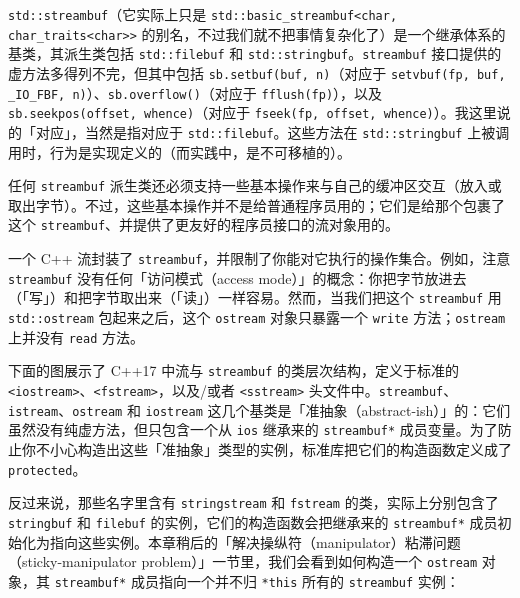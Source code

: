 \texttt{std::\allowbreak{}streambuf}（它实际上只是 \texttt{std::\allowbreak{}basic\_\allowbreak{}streambuf<\allowbreak{}char,\allowbreak{}} \texttt{char\_\allowbreak{}traits<char>{}>} 的别名，不过我们就不把事情复杂化了）是一个继承体系的基类，其派生类包括 \texttt{std::\allowbreak{}filebuf} 和 \texttt{std::\allowbreak{}stringbuf}。\texttt{streambuf} 接口提供的虚方法多得列不完，但其中包括 \texttt{sb.\allowbreak{}setbuf(\allowbreak{}buf,\allowbreak{} n)\allowbreak{}}（对应于 \texttt{setvbuf(\allowbreak{}fp,\allowbreak{} buf,\allowbreak{} \_\allowbreak{}IO\_\allowbreak{}FBF,\allowbreak{} n)\allowbreak{}}）、\texttt{sb.\allowbreak{}overflow(\allowbreak{})\allowbreak{}}（对应于 \texttt{fflush(\allowbreak{}fp)\allowbreak{}}），以及 \texttt{sb.\allowbreak{}seekpos(\allowbreak{}offset,\allowbreak{} whence)\allowbreak{}}（对应于 \texttt{fseek(\allowbreak{}fp,\allowbreak{} offset,\allowbreak{} whence)\allowbreak{}}）。我这里说的「对应」，当然是指对应于 \texttt{std::\allowbreak{}filebuf}。这些方法在 \texttt{std::\allowbreak{}stringbuf} 上被调用时，行为是实现定义的（而实践中，是不可移植的）。

任何 \texttt{streambuf} 派生类还必须支持一些基本操作来与自己的缓冲区交互（放入或取出字节）。不过，这些基本操作并不是给普通程序员用的；它们是给那个包裹了这个 \texttt{streambuf}、并提供了更友好的程序员接口的流对象用的。

一个 C++ 流封装了 \texttt{streambuf}，并限制了你能对它执行的操作集合。例如，注意 \texttt{streambuf} 没有任何「访问模式（access mode）」的概念：你把字节放进去（「写」）和把字节取出来（「读」）一样容易。然而，当我们把这个 \texttt{streambuf} 用 \texttt{std::\allowbreak{}ostream} 包起来之后，这个 \texttt{ostream} 对象只暴露一个 \texttt{write} 方法；\texttt{ostream} 上并没有 \texttt{read} 方法。

下面的图展示了 C++17 中流与 \texttt{streambuf} 的类层次结构，定义于标准的 \texttt{<iostream>\allowbreak{}}、\texttt{<fstream>\allowbreak{}}，以及/或者 \texttt{<sstream>\allowbreak{}} 头文件中。\texttt{streambuf}、\texttt{istream}、\texttt{ostream} 和 \texttt{iostream} 这几个基类是「准抽象（abstract-ish）」的：它们虽然没有纯虚方法，但只包含一个从 \texttt{ios} 继承来的 \texttt{streambuf*} 成员变量。为了防止你不小心构造出这些「准抽象」类型的实例，标准库把它们的构造函数定义成了 \texttt{protected}。

反过来说，那些名字里含有 \texttt{stringstream} 和 \texttt{fstream} 的类，实际上分别包含了 \texttt{stringbuf} 和 \texttt{filebuf} 的实例，它们的构造函数会把继承来的 \texttt{streambuf*} 成员初始化为指向这些实例。本章稍后的「解决操纵符（manipulator）粘滞问题（sticky-manipulator problem）」一节里，我们会看到如何构造一个 \texttt{ostream} 对象，其 \texttt{streambuf*} 成员指向一个并不归 \texttt{*this} 所有的 \texttt{streambuf} 实例：

